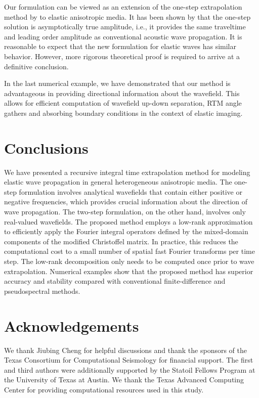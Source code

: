 Our formulation can be viewed as an extension of the one-step extrapolation method by \cite{zhang09} to elastic anisotropic media. It has been shown by \cite{bleistein08} that the one-step solution is asymptotically true amplitude, i.e., it provides the same traveltime and leading order amplitude as conventional acoustic wave propagation. It is reasonable to expect that the new formulation for elastic waves has similar behavior. However, more rigorous theoretical proof is required to arrive at a definitive conclusion.

In the last numerical example, we have demonstrated that our method is advantageous in providing directional information about the wavefield. This allows for efficient computation of wavefield up-down separation, RTM angle gathers and absorbing boundary conditions \cite[]{shen15,hu16,me15b} in the context of elastic imaging.

\section{Conclusions}
We have presented a recursive integral time extrapolation method for modeling elastic wave propagation in general heterogeneous anisotropic media. The one-step formulation involves analytical wavefields that contain either positive or negative frequencies, which provides crucial information about the direction of wave propagation. The two-step formulation, on the other hand, involves only real-valued wavefields. The proposed method employs a low-rank approximation to efficiently apply the Fourier integral operators defined by the mixed-domain components of the modified Christoffel matrix. In practice, this reduces the computational cost to a small number of spatial fast Fourier transforms per time step. The low-rank decomposition only needs to be computed once prior to wave extrapolation. Numerical examples show that the proposed method has superior accuracy and stability compared with conventional finite-difference and pseudospectral methods. 

\section{Acknowledgements}
We thank Jiubing Cheng for helpful discussions and thank the sponsors of the Texas Consortium for Computational Seismology for financial support. The first and third authors were additionally supported by the Statoil Fellows Program at the University of Texas at Austin. We thank the Texas Advanced Computing Center for providing computational resources used in this study.




